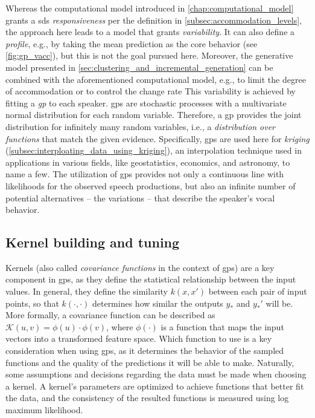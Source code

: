 Whereas the computational model introduced in \cref{chap:computational_model} grants a \ac{sds} \emph{responsiveness} per the definition in \cref{subsec:accommodation_levels}, the approach here leads to a model that grants \emph{variability}.
It can also define a \emph{profile}, e.g., by taking the mean prediction as the core behavior (see \cref{fig:gp_vacc}), but this is not the goal pursued here.
Moreover, the generative model presented in \cref{sec:clustering_and_incremental_generation} can be combined with the aforementioned computational model, e.g., to limit the degree of accommodation or to control the change rate
This variability is achieved by fitting a \emph{\ac{gp}} to each speaker.
\Acp{gp} are stochastic processes with a multivariate normal distribution for each random variable.
Therefore, a \ac{gp} provides the joint distribution for infinitely many random variables, i.e., a \emph{distribution over functions} that match the given evidence.
Specifically, \acp{gp} are used here for \emph{kriging} (\cref{subsec:interploating_data_using_kriging}), an interpolation technique used in applications in various fields, like geostatistics, economics, and astronomy, to name a few.
The utilization of \acp{gp} provides not only a continuous line with likelihoods for the observed speech productions, but also an infinite number of potential alternatives -- the variations -- that describe the speaker's vocal behavior.

\subsection{Kernel building and tuning}
\label{subsec:covariance_functions}


Kernels (also called \textit{covariance functions} in the context of \acp{gp}) are a key component in \acp{gp}, as they define the statistical relationship between the input values.
In general, they define the similarity $k(x, x')$ between each pair of input points, so that $k(\cdot, \cdot)$ determines how similar the outputs $y_*$ and $y_*'$ will be. 
More formally, a covariance function can be described as $\mathcal{K}(u, v) = \phi(u) \cdot \phi(v)$, where $\phi(\cdot)$ is a function that maps the input vectors into a transformed feature space.
Which function to use is a key consideration when using \acp{gp}, as it determines the behavior of the sampled functions and the quality of the predictions it will be able to make.
Naturally, some assumptions and decisions regarding the data must be made when choosing a kernel.
A kernel's parameters are optimized to achieve functions that better fit the data, and the consistency of the resulted functions is measured using log maximum likelihood.


